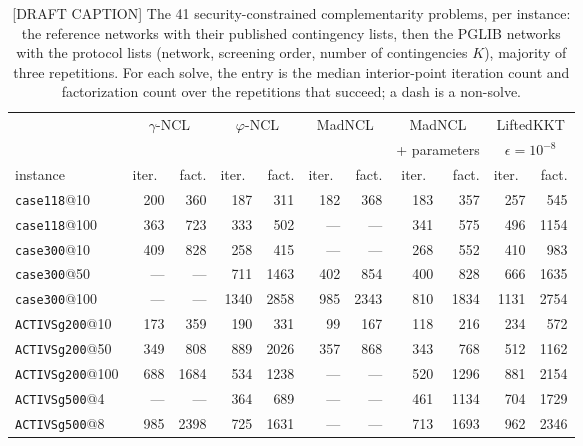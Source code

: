 \begin{table}[tbp]\centering\small\setlength{\tabcolsep}{3pt}\renewcommand{\arraystretch}{0.95}
\caption{[DRAFT CAPTION] The 41 security-constrained complementarity problems, per instance: the reference networks with their published contingency lists, then the PGLIB networks with the protocol lists (network, screening order, number of contingencies $K$), majority of three repetitions. For each solve, the entry is the median interior-point iteration count and factorization count over the repetitions that succeed; a dash is a non-solve.}
\label{tab:gpu-scopf}
\begin{tabular}{lrrrrrrrrrr}\toprule
 & \multicolumn{2}{c}{$\gamma$-NCL} & \multicolumn{2}{c}{$\varphi$-NCL} & \multicolumn{2}{c}{MadNCL} & \multicolumn{2}{c}{MadNCL} & \multicolumn{2}{c}{LiftedKKT} \\
 & \multicolumn{2}{c}{} & \multicolumn{2}{c}{} & \multicolumn{2}{c}{} & \multicolumn{2}{c}{+ parameters} & \multicolumn{2}{c}{$\epsilon=10^{-8}$} \\
\cmidrule(lr){2-3} \cmidrule(lr){4-5} \cmidrule(lr){6-7} \cmidrule(lr){8-9} \cmidrule(lr){10-11}
instance & iter.\ & fact. & iter.\ & fact. & iter.\ & fact. & iter.\ & fact. & iter.\ & fact. \\\midrule
\texttt{case118}@10 & 200 & 360 & 187 & 311 & 182 & 368 & 183 & 357 & 257 & 545 \\
\texttt{case118}@100 & 363 & 723 & 333 & 502 & --- & --- & 341 & 575 & 496 & 1154 \\
\texttt{case300}@10 & 409 & 828 & 258 & 415 & --- & --- & 268 & 552 & 410 & 983 \\
\texttt{case300}@50 & --- & --- & 711 & 1463 & 402 & 854 & 400 & 828 & 666 & 1635 \\
\texttt{case300}@100 & --- & --- & 1340 & 2858 & 985 & 2343 & 810 & 1834 & 1131 & 2754 \\
\texttt{ACTIVSg200}@10 & 173 & 359 & 190 & 331 & 99 & 167 & 118 & 216 & 234 & 572 \\
\texttt{ACTIVSg200}@50 & 349 & 808 & 889 & 2026 & 357 & 868 & 343 & 768 & 512 & 1162 \\
\texttt{ACTIVSg200}@100 & 688 & 1684 & 534 & 1238 & --- & --- & 520 & 1296 & 881 & 2154 \\
\texttt{ACTIVSg500}@4 & --- & --- & 364 & 689 & --- & --- & 461 & 1134 & 704 & 1729 \\
\texttt{ACTIVSg500}@8 & 985 & 2398 & 725 & 1631 & --- & --- & 713 & 1693 & 962 & 2346 \\

\end{tabular}
\end{table}
